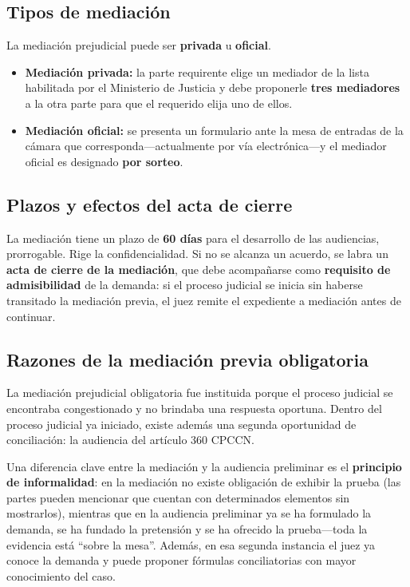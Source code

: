 \documentclass[12pt,oneside]{book}
\begin{document}
\subsection{Tipos de mediación}

La mediación prejudicial puede ser \textbf{privada} u \textbf{oficial}.

\begin{itemize}
    \item \textbf{Mediación privada:} la parte requirente elige un mediador
    de la lista habilitada por el Ministerio de Justicia y debe proponerle
    \textbf{tres mediadores} a la otra parte para que el requerido elija
    uno de ellos.
    \item \textbf{Mediación oficial:} se presenta un formulario ante la
    mesa de entradas de la cámara que corresponda---actualmente por vía
    electrónica---y el mediador oficial es designado \textbf{por sorteo}.
\end{itemize}

\subsection{Plazos y efectos del acta de cierre}

La mediación tiene un plazo de \textbf{60 días} para el desarrollo de
las audiencias, prorrogable. Rige la confidencialidad. Si no se alcanza
un acuerdo, se labra un \textbf{acta de cierre de la mediación}, que
debe acompañarse como \textbf{requisito de admisibilidad} de la demanda:
si el proceso judicial se inicia sin haberse transitado la mediación
previa, el juez remite el expediente a mediación antes de continuar.

\subsection{Razones de la mediación previa obligatoria}

La mediación prejudicial obligatoria fue instituida porque el proceso
judicial se encontraba congestionado y no brindaba una respuesta
oportuna. Dentro del proceso judicial ya iniciado, existe además una
segunda oportunidad de conciliación: la audiencia del artículo 360
CPCCN.

\begin{note}
Una diferencia clave entre la mediación y la audiencia preliminar es
el \textbf{principio de informalidad}: en la mediación no existe
obligación de exhibir la prueba (las partes pueden mencionar que
cuentan con determinados elementos sin mostrarlos), mientras que en
la audiencia preliminar ya se ha formulado la demanda, se ha fundado
la pretensión y se ha ofrecido la prueba---toda la evidencia está
``sobre la mesa''. Además, en esa segunda instancia el juez ya conoce
la demanda y puede proponer fórmulas conciliatorias con mayor
conocimiento del caso.
\end{note}
\end{document}
